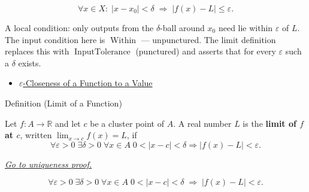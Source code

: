 \begin{remark*}
\[
  \forall x \in X :\;
  |x - x_0| < \delta \;\Rightarrow\; |f(x) - L| \leq \varepsilon.
\]
\end{remark*}

\begin{remark*}[Interpretation]
A local condition: only outputs from the $\delta$-ball around $x_0$
need lie within $\varepsilon$ of $L$. The input condition here is
$\operatorname{Within}$ --- unpunctured. The limit definition replaces
this with $\operatorname{InputTolerance}$ (punctured) and asserts
that for every $\varepsilon$ such a $\delta$ exists.
\end{remark*}

\begin{dependencies}
\begin{itemize}
  \item \hyperref[def:eps-close-function]{$\varepsilon$-Closeness of a Function to a Value}
\end{itemize}
\end{dependencies}


\begin{definitionbox}{Definition (Limit of a Function)}
\begin{definition}
\label{def:limit-function}
Let $f : A \to \mathbb{R}$ and let $c$ be a cluster point of $A$.
A real number $L$ is the \textbf{limit of $f$ at $c$}, written
$\lim_{x \to c} f(x) = L$, if
\[
  \forall\varepsilon>0\;\exists\delta>0\;\forall x\in A\;
  0<|x-c|<\delta\Rightarrow |f(x)-L|<\varepsilon.
\]

\smallskip\noindent
\hyperref[prf:limit-unique]{\textit{Go to uniqueness proof.}}
\end{definition}
\end{definitionbox}

\begin{remark*}
\[
  \forall\varepsilon > 0\;\exists\delta > 0\;\forall x \in A\;
  0 < |x - c| < \delta
  \;\Rightarrow\;
  |f(x) - L| < \varepsilon.
\]
\end{remark*}

